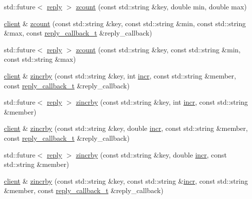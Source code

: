 \begin{DoxyCompactItemize}
\item 
std\+::future$<$ \hyperlink{classcpp__redis_1_1reply}{reply} $>$ \hyperlink{classcpp__redis_1_1client_a7d3ddea81b718564c060a51575d8c127}{zcount} (const std\+::string \&key, double min, double max)
\item 
\hyperlink{classcpp__redis_1_1client}{client} \& \hyperlink{classcpp__redis_1_1client_a4638b70036c17ddd87dc204392ea7718}{zcount} (const std\+::string \&key, const std\+::string \&min, const std\+::string \&max, const \hyperlink{classcpp__redis_1_1client_a061a1140d36d2eaeda82b09a0bb3f9f2}{reply\+\_\+callback\+\_\+t} \&reply\+\_\+callback)
\item 
std\+::future$<$ \hyperlink{classcpp__redis_1_1reply}{reply} $>$ \hyperlink{classcpp__redis_1_1client_a94416b729f3ecd32d41450725e773590}{zcount} (const std\+::string \&key, const std\+::string \&min, const std\+::string \&max)
\item 
\hyperlink{classcpp__redis_1_1client}{client} \& \hyperlink{classcpp__redis_1_1client_a7852309fc3054c1bce760e4e2189205b}{zincrby} (const std\+::string \&key, int \hyperlink{classcpp__redis_1_1client_a2f9ba6c7e83451207403096b19da4faa}{incr}, const std\+::string \&member, const \hyperlink{classcpp__redis_1_1client_a061a1140d36d2eaeda82b09a0bb3f9f2}{reply\+\_\+callback\+\_\+t} \&reply\+\_\+callback)
\item 
std\+::future$<$ \hyperlink{classcpp__redis_1_1reply}{reply} $>$ \hyperlink{classcpp__redis_1_1client_ada07e0534d23fd0247cdc1b9a8008fe9}{zincrby} (const std\+::string \&key, int \hyperlink{classcpp__redis_1_1client_a2f9ba6c7e83451207403096b19da4faa}{incr}, const std\+::string \&member)
\item 
\hyperlink{classcpp__redis_1_1client}{client} \& \hyperlink{classcpp__redis_1_1client_abeb105281afc762ed57afce5619ef73f}{zincrby} (const std\+::string \&key, double \hyperlink{classcpp__redis_1_1client_a2f9ba6c7e83451207403096b19da4faa}{incr}, const std\+::string \&member, const \hyperlink{classcpp__redis_1_1client_a061a1140d36d2eaeda82b09a0bb3f9f2}{reply\+\_\+callback\+\_\+t} \&reply\+\_\+callback)
\item 
std\+::future$<$ \hyperlink{classcpp__redis_1_1reply}{reply} $>$ \hyperlink{classcpp__redis_1_1client_a59164f47b17261f1a82cef5da072aa4c}{zincrby} (const std\+::string \&key, double \hyperlink{classcpp__redis_1_1client_a2f9ba6c7e83451207403096b19da4faa}{incr}, const std\+::string \&member)
\item 
\hyperlink{classcpp__redis_1_1client}{client} \& \hyperlink{classcpp__redis_1_1client_a6f0b61b420ebc8e054c766c6f5034096}{zincrby} (const std\+::string \&key, const std\+::string \&\hyperlink{classcpp__redis_1_1client_a2f9ba6c7e83451207403096b19da4faa}{incr}, const std\+::string \&member, const \hyperlink{classcpp__redis_1_1client_a061a1140d36d2eaeda82b09a0bb3f9f2}{reply\+\_\+callback\+\_\+t} \&reply\+\_\+callback)

\end{DoxyCompactItemize}
